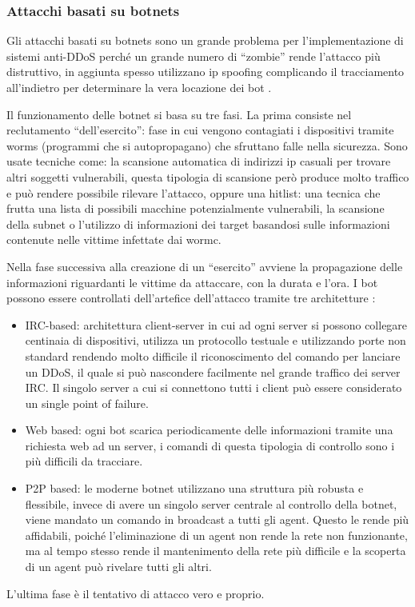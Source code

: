 \subsubsection{Attacchi basati su botnets}

Gli attacchi basati su botnets sono un grande problema per l'implementazione di sistemi anti-DDoS perché un grande numero di ``zombie'' rende l'attacco più distruttivo, in aggiunta spesso utilizzano ip spoofing complicando il tracciamento all'indietro per determinare la vera locazione dei bot \cite{ddos_survey_1}.

Il funzionamento delle botnet si basa su tre fasi. La prima consiste nel reclutamento ``dell'esercito'': fase in cui vengono contagiati i dispositivi tramite worms (programmi che si autopropagano) che sfruttano falle nella sicurezza. Sono usate tecniche come: la scansione automatica di indirizzi ip casuali per trovare altri soggetti vulnerabili, questa tipologia di scansione però produce molto traffico e può rendere possibile rilevare l'attacco, oppure una hitlist: una tecnica che frutta una lista di possibili macchine potenzialmente vulnerabili, la scansione della subnet o l'utilizzo di informazioni dei target basandosi sulle informazioni contenute nelle vittime infettate dai wormc.


Nella fase successiva alla creazione di un ``esercito'' avviene la propagazione delle informazioni riguardanti le vittime da attaccare, con la durata e l'ora.
I bot possono essere controllati dell'artefice dell'attacco tramite tre architetture \cite{ddos_survey_4}: %
\begin{itemize}
    \item IRC-based: architettura client-server in cui ad ogni server si possono collegare centinaia di dispositivi, utilizza un protocollo testuale e utilizzando porte non standard rendendo molto difficile il riconoscimento del comando per lanciare un DDoS, il quale si può nascondere facilmente nel grande traffico dei server IRC. Il singolo server a cui si connettono tutti i client può essere considerato un single point of failure.
    \item Web based: ogni bot scarica periodicamente delle informazioni tramite una richiesta web ad un server, i comandi di questa tipologia di controllo sono i più difficili da tracciare.
    \item P2P based: le moderne botnet utilizzano una struttura più robusta e flessibile, invece di avere un singolo server centrale al controllo della botnet, viene mandato un comando in broadcast a tutti gli agent. Questo le rende più affidabili, poiché l'eliminazione di un agent non rende la rete non funzionante, ma al tempo stesso rende il mantenimento della rete più difficile e la scoperta di un agent può rivelare tutti gli altri. 
\end{itemize}
L'ultima fase è il tentativo di attacco vero e proprio.

